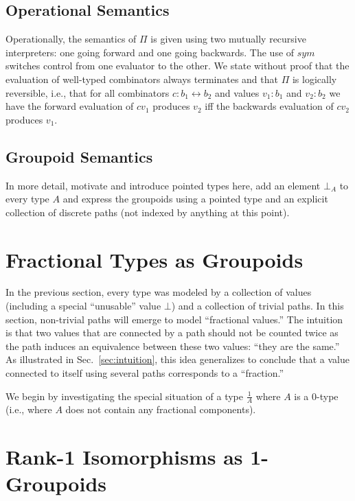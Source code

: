 \documentclass[11pt]{article}
\newcommand{\iso}{\leftrightarrow}
\newcommand{\symc}[1]{\mathit{sym}~#1}
\begin{document}
\subsection{Operational Semantics} 

Operationally, the semantics of $\Pi$ is given using two mutually recursive
interpreters: one going forward and one going backwards. The use of $\symc{}$
switches control from one evaluator to the other.  We state without proof
that the evaluation of well-typed combinators always terminates and that
$\Pi$ is logically reversible, i.e., that for all combinators $c : b_1 \iso
b_2$ and values $v_1 : b_1$ and $v_2 : b_2$ we have the forward evaluation of
$c v_1$ produces $v_2$ iff the backwards evaluation of $c v_2$ produces
$v_1$.

\subsection{Groupoid Semantics} 

In more detail, motivate and introduce pointed types here, add
an element $\bot_A$ to every type $A$ and express the groupoids using a
pointed type and an explicit collection of discrete paths (not indexed by
anything at this point).

\section{Fractional Types as Groupoids} 

In the previous section, every type was modeled by a collection of values
(including a special ``unusable'' value $\bot$) and a collection of trivial
paths. In this section, non-trivial paths will emerge to model ``fractional
values.'' The intuition is that two values that are connected by a path
should not be counted twice as the path induces an equivalence between these
two values: ``they are the same.'' As illustrated in
Sec.~\ref{sec:intuition}, this idea generalizes to conclude that a value
connected to itself using several paths corresponds to a ``fraction.''

We begin by investigating the special situation of a type $\frac{1}{A}$ where
$A$ is a 0-type (i.e., where $A$ does not contain any fractional components).

\section{Rank-1 Isomorphisms as 1-Groupoids}
\end{document}
